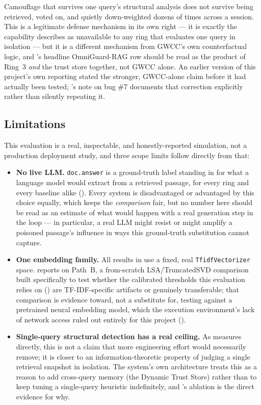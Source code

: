 Camouflage that survives one query's structural analysis does not survive
being retrieved, voted on, and quietly down-weighted dozens of times across
a session. This is a legitimate defense mechanism in its own right --- it is
exactly the capability  describes as unavailable to
any ring that evaluates one query in isolation --- but it is a different
mechanism from GWCC's own counterfactual logic, and 's
headline OmniGuard-RAG row should be read as the product of Ring~3
\emph{and} the trust store together, not GWCC alone. An earlier version of
this project's own reporting stated the stronger, GWCC-alone claim before
it had actually been tested; 's note on bug \#7
documents that correction explicitly rather than silently repeating it.

\subsection{Limitations}
\label{sec:limitations}

This evaluation is a real, inspectable, and honestly-reported simulation,
not a production deployment study, and three scope limits follow directly
from that:

\begin{itemize}
\item \textbf{No live LLM.} \texttt{doc.answer} is a ground-truth label
  standing in for what a language model would extract from a retrieved
  passage, for every ring and every baseline alike ().
  Every system is disadvantaged or advantaged by this choice equally, which
  keeps the \emph{comparison} fair, but no number here should be read as an
  estimate of what would happen with a real generation step in the loop ---
  in particular, a real LLM might resist or might amplify a poisoned
  passage's influence in ways this ground-truth substitution cannot
  capture.
\item \textbf{One embedding family.} All results in  use
  a fixed, real \texttt{TfidfVectorizer} space. 
  reports on Path~B, a from-scratch LSA/TruncatedSVD comparison built
  specifically to test whether the calibrated thresholds this evaluation
  relies on () are TF-IDF-specific artifacts or
  genuinely transferable; that comparison is evidence toward, not a
  substitute for, testing against a pretrained neural embedding model,
  which the execution environment's lack of network access ruled out
  entirely for this project ().
\item \textbf{Single-query structural detection has a real ceiling.} As
   measures directly, this is not a claim that more
  engineering effort would necessarily remove; it is closer to an
  information-theoretic property of judging a single retrieval snapshot in
  isolation. The system's own architecture treats this as a reason to add
  cross-query memory (the Dynamic Trust Store) rather than to keep tuning
  a single-query heuristic indefinitely, and 's
  ablation is the direct evidence for why.
\end{itemize}
